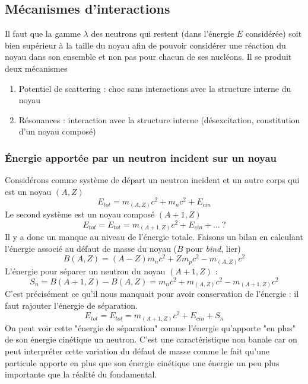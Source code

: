 \subsection{Mécanismes d'interactions}
Il faut que la gamme $\lambda$ des neutrons qui restent (dans l'énergie $E$ considérée) soit bien 
supérieur à la taille du noyau afin de pouvoir considérer une réaction du  noyau dans son ensemble
et non pas pour chacun de ses nucléons. Il se produit deux mécanismes
\begin{enumerate}
\item Potentiel de scattering : choc sans interactions avec la structure interne du noyau
\item Résonances : interaction avec la structure interne (désexcitation, constitution d'un noyau 
composé)
\end{enumerate}

\subsubsection{Énergie apportée par un neutron incident sur un noyau}
Considérons comme système de départ un neutron incident et un autre corps qui est un noyau $(A,Z)$
\begin{equation}
E_{tot} = m_{(A,Z)}c^2 + m_nc^2+E_{cin}
\end{equation}
Le second système est un noyau composé $(A+1, Z)$
\begin{equation}
E_{tot}=E_{tot} = m_{(A+1,Z)}c^2 +E_{cin}+\dots\ ? 
\end{equation}
Il y a donc un manque au niveau de l'énergie totale. Faisons un bilan en calculant l'énergie 
associé au défaut de masse du noyau ($B$ pour \textit{bind}, lier)
\begin{equation}
B(A,Z) = (A-Z)m_nc^2+Zm_pc^2 - m_{(A,Z)}c^2
\end{equation}
L'énergie pour séparer un neutron du noyau $(A+1,Z)$ :
\begin{equation}
S_n = B(A+1,Z)-B(A,Z) = m_nc^2+m_{(A,Z)}c^2-m_{(A+1,Z)}c^2
\end{equation}
C'est précisément ce qu'il nous manquait pour avoir conservation de l'énergie : il faut 
rajouter l'énergie de séparation.
\begin{equation}
E_{tot}=E_{tot} = m_{(A+1,Z)}c^2 +E_{cin}+S_n
\end{equation}
On peut voir cette "énergie de séparation" comme l'énergie qu'apporte "en plus" de son énergie 
cinétique un neutron. C'est une caractéristique non banale car on peut interpréter cette variation 
du défaut de masse comme le fait qu'une particule apporte en plus que son énergie cinétique une 
énergie un peu plus importante que la réalité du fondamental. 

